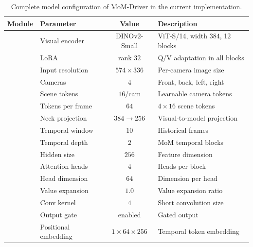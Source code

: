 \begin{table}[t]
\centering
\footnotesize
\setlength{\tabcolsep}{6pt}
\renewcommand{\arraystretch}{1}
\caption{Complete model configuration of MoM-Driver in the current implementation.}
\label{tab:mom_full_config}
\begin{tabularx}{\linewidth}{l l c X}
\toprule
\textbf{Module} & \textbf{Parameter} & \textbf{Value} & \textbf{Description} \\
\midrule

 & Visual encoder      & DINOv2-Small          & ViT-S/14, width $384$, 12 blocks \\
 & LoRA                & rank $32$             & Q/V adaptation in all blocks \\
 & Input resolution    & $574 \times 336$      & Per-camera image size \\
 & Cameras             & $4$                   & Front, back, left, right \\
 & Scene tokens        & $16$/cam              & Learnable camera tokens \\
 & Tokens per frame    & $64$                  & $4 \times 16$ scene tokens \\
 & Neck projection     & $384 \rightarrow 256$ & Visual-to-model projection \\
\midrule

 & Temporal window     & $10$                  & Historical frames \\
 & Temporal depth      & $2$                   & MoM temporal blocks \\
 & Hidden size         & $256$                 & Feature dimension \\
 & Attention heads     & $4$                   & Heads per block \\
 & Head dimension      & $64$                  & Dimension per head \\
 & Value expansion     & $1.0$                 & Value expansion ratio \\
 & Conv kernel         & $4$                   & Short convolution size \\
 & Output gate         & enabled               & Gated output \\
 & Positional embedding & $1\times64\times256$ & Temporal token embedding \\
\midrule


\end{tabularx}
\end{table}
